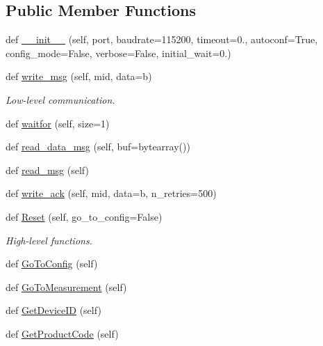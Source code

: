 \subsection*{Public Member Functions}
\begin{DoxyCompactItemize}
\item 
def \hyperlink{classmtdevice_1_1MTDevice_a9a93b603a3c9ab6a7ad9027e436799d4}{\+\_\+\+\_\+init\+\_\+\+\_\+} (self, port, baudrate=115200, timeout=0., autoconf=True, config\+\_\+mode=False, verbose=False, initial\+\_\+wait=0.)
\item 
def \hyperlink{classmtdevice_1_1MTDevice_a8b4e4d222ab28dd708a4ecc220af343c}{write\+\_\+msg} (self, mid, data=b\textquotesingle{}\textquotesingle{})
\begin{DoxyCompactList}\small\item\em Low-\/level communication. \end{DoxyCompactList}\item 
def \hyperlink{classmtdevice_1_1MTDevice_a072aad4573d20a44ac7d18fcbf985546}{waitfor} (self, size=1)
\item 
def \hyperlink{classmtdevice_1_1MTDevice_a86a979700d1d0f891943e7275d470f1f}{read\+\_\+data\+\_\+msg} (self, buf=bytearray())
\item 
def \hyperlink{classmtdevice_1_1MTDevice_ac5598d36cd10ab80e28d41c60281addd}{read\+\_\+msg} (self)
\item 
def \hyperlink{classmtdevice_1_1MTDevice_aecbd2a94d3e4b6dd67193549d3668d2f}{write\+\_\+ack} (self, mid, data=b\textquotesingle{}\textquotesingle{}, n\+\_\+retries=500)
\item 
def \hyperlink{classmtdevice_1_1MTDevice_aa3a48c919b8a17d421468faba4b7045f}{Reset} (self, go\+\_\+to\+\_\+config=False)
\begin{DoxyCompactList}\small\item\em High-\/level functions. \end{DoxyCompactList}\item 
def \hyperlink{classmtdevice_1_1MTDevice_a61464532dbf30f237794801053ef89e1}{Go\+To\+Config} (self)
\item 
def \hyperlink{classmtdevice_1_1MTDevice_ab6e5df72a835897e8e376e574e07376e}{Go\+To\+Measurement} (self)
\item 
def \hyperlink{classmtdevice_1_1MTDevice_aa634cb80bc49f34e4a41fd9214f20d9a}{Get\+Device\+ID} (self)
\item 
def \hyperlink{classmtdevice_1_1MTDevice_a80f12839fe7f3ebe2e94a8c21641f2ae}{Get\+Product\+Code} (self)
\item 

\end{DoxyCompactItemize}
